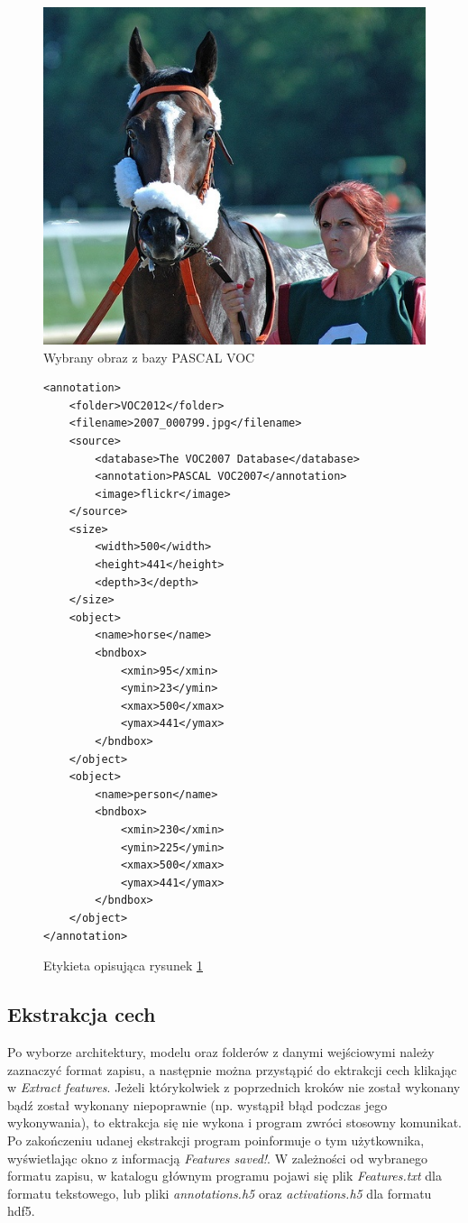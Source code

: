 \documentclass[a4paper,twoside,12pt]{book}
\begin{document}
{\begin{figure}[h!]

\centering
\includegraphics[scale=0.4]{2007_000799.jpg}
\caption{Wybrany obraz z bazy PASCAL VOC}
\label{example}
\end{figure}

\begin{figure}
\centering
\begin{lstlisting}
<annotation>
	<folder>VOC2012</folder>
	<filename>2007_000799.jpg</filename>
	<source>
		<database>The VOC2007 Database</database>
		<annotation>PASCAL VOC2007</annotation>
		<image>flickr</image>
	</source>
	<size>
		<width>500</width>
		<height>441</height>
		<depth>3</depth>
	</size>
	<object>
		<name>horse</name>
		<bndbox>
			<xmin>95</xmin>
			<ymin>23</ymin>
			<xmax>500</xmax>
			<ymax>441</ymax>
		</bndbox>
	</object>
	<object>
		<name>person</name>
		<bndbox>
			<xmin>230</xmin>
			<ymin>225</ymin>
			<xmax>500</xmax>
			<ymax>441</ymax>
		</bndbox>
	</object>
</annotation>

\end{lstlisting}
\caption{Etykieta opisująca rysunek \ref{example}}
\label{etykieta}
\end{figure}
\subsection{Ekstrakcja cech}
{Po wyborze architektury, modelu oraz folderów z danymi wejściowymi należy zaznaczyć format zapisu, a następnie można przystąpić do ektrakcji cech klikając w \emph{Extract features}. Jeżeli którykolwiek z poprzednich kroków nie został wykonany bądź został wykonany niepoprawnie (np. wystąpił błąd podczas jego wykonywania), to ektrakcja się nie wykona i program zwróci stosowny komunikat. Po zakończeniu udanej ekstrakcji program poinformuje o tym użytkownika, wyświetlając okno z informacją \emph{Features saved!}. W zależności od wybranego formatu zapisu, w katalogu głównym programu pojawi się plik \emph{Features.txt} dla formatu tekstowego, lub pliki \emph{annotations.h5} oraz  \emph{activations.h5} dla formatu hdf5. }
}
\end{document}
